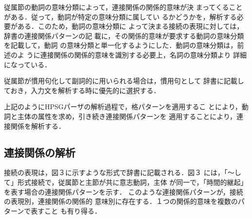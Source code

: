 従属節の動詞の意味分類によって，連接関係の関係的意味が決
まってくることがある．従って，動詞が特定の意味分類に属してい
るかどうかを，解析する必要がある．このため，動詞の意味分類に
よって決まる接続の表現に対しては，辞書の連接関係パターンの記
載に，その関係的意味が要求する動詞の意味分類を記載して，動詞
の意味分類と単一化するようにした．動詞の意味分類は，前述のよ
うに連接関係の関係的意味を識別する必要上，名詞の意味分類より
詳細になっている．

従属節が慣用句化して副詞的に用いられる場合は，慣用句として
辞書に記載しておき，入力文を解析する時に優先的に選択する．

上記のようにHPSGパーザの解析過程で，格パターンを適用するこ
とにより，動詞と主体の属性を求め，引き続き連接関係パターンを
適用することにより，連接関係を解析する．

\subsection{連接関係の解析}
接続の表現は，図３に示すような形式で辞書に記載される．図３
には，「〜して」形式接続で，従属節と主節が共に意志動詞，主体
が同一で，「時間的継起」を表す場合の連接関係パターンを示す．
このような連接関係パターンが，接続の表現別，連接関係の関係的
意味別に存在する．１つの関係的意味を複数のパターンで表すこと
も有り得る．

